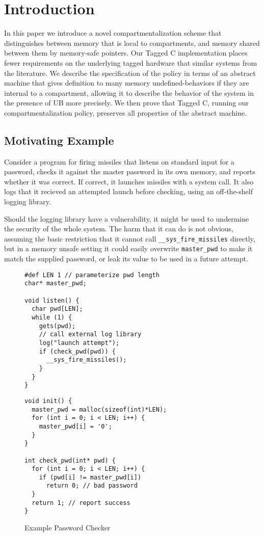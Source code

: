 \section{Introduction}

In this paper we introduce a novel compartmentalization scheme that distinguishes between memory
that is local to compartments, and memory shared between them by memory-safe pointers. Our Tagged
C implementation places fewer requirements on the underlying tagged hardware that similar systems
from the literature. We describe the specification of the policy in terms of an abstract machine
that gives definition to many memory undefined-behaviors if they are internal to a compartment,
allowing it to describe the behavior of the system in the presence of UB more precisely. We then prove
that Tagged C, running our compartmentalization policy, preserves all properties of the abstract
machine.

\subsection{Motivating Example}

Consider a program for firing missiles that listens on standard input for a password,
checks it against the master password in its own memory, and reports whether it was correct.
If correct, it launches missiles with a system call. It also logs that it recieved an attempted
launch before checking, using an off-the-shelf logging library.

Should the logging library have a vulnerability, it might be used to undermine the security
of the whole system. The harm that it can do is not obvious, assuming the basic restriction that
it cannot call {\tt \_\_sys\_fire\_missiles} directly, but in a memory unsafe setting it could
easily overwrite {\tt master\_pwd} to make it match the supplied password, or leak its value to
be used in a future attempt.

\begin{figure}
  \begin{minipage}[t]{0.5\textwidth}
\begin{verbatim}
#def LEN 1 // parameterize pwd length
char* master_pwd;

void listen() {
  char pwd[LEN];
  while (1) {
    gets(pwd);
    // call external log library 
    log("launch attempt");
    if (check_pwd(pwd)) {
      __sys_fire_missiles();
    }
  }
}
\end{verbatim}
  \end{minipage}
  \begin{minipage}[t]{0.49\textwidth}
\begin{verbatim}
void init() {
  master_pwd = malloc(sizeof(int)*LEN);
  for (int i = 0; i < LEN; i++) {
    master_pwd[i] = '0';
  }
}

int check_pwd(int* pwd) {
  for (int i = 0; i < LEN; i++) {
    if (pwd[i] != master_pwd[i])
      return 0; // bad password
  }
  return 1; // report success
}
\end{verbatim}
  \end{minipage}

\caption{Example Password Checker}
\label{ch5:fig:exchecker}
\end{figure}

